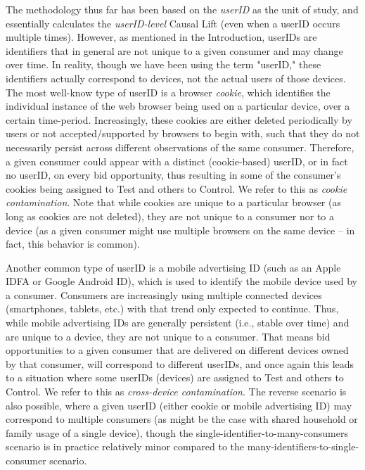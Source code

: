 \documentclass[11pt,a4paper]{article}
\theoremstyle{definition}
\theoremstyle{remark}
\theoremstyle{definition}
\theoremstyle{definition}
\theoremstyle{definition}
\theoremstyle{definition}
\theoremstyle{definition}
\theoremstyle{definition}
\begin{document}
The methodology thus far has been based on the \textit{userID} as the unit of study, and essentially calculates the \textit{userID-level} Causal Lift (even when a userID occurs multiple times). However, as mentioned in the Introduction, userIDs are identifiers that in general are not unique to a given consumer and may change over time. In reality, though we have been using the term "userID," these identifiers actually correspond to devices, not the actual users of those devices. The most well-know type of userID is a browser \textit{cookie}, which identifies the individual instance of the web browser being used on a particular device, over a certain time-period. Increasingly, these cookies are either deleted periodically by users or not accepted/supported by browsers to begin with, such that they do not necessarily persist across different observations of the same consumer. Therefore, a given consumer could appear with a distinct (cookie-based) userID, or in fact no userID, on every bid opportunity, thus resulting in some of the consumer's cookies being assigned to Test and others to Control. 
We refer to this as \textit{cookie contamination}. Note that while cookies are unique to a particular browser (as long as cookies are not deleted), they are not unique to a consumer nor to a device (as a given consumer might use multiple browsers on the same device -- in fact, this behavior is common).

Another common type of userID is a mobile advertising ID (such as an Apple IDFA or Google Android ID), which is used to identify the mobile device used by a consumer. Consumers are increasingly using multiple connected devices (smartphones, tablets, etc.) with that trend only expected to continue. Thus, while mobile advertising IDs are generally persistent (i.e., stable over time) and are unique to a device, they are not unique to a consumer. That means bid opportunities to a given consumer that are delivered on different devices owned by that consumer, will correspond to different userIDs, and once again this leads to a situation where some userIDs (devices) are assigned to Test and others to Control. We refer to this as \textit{cross-device contamination}. The reverse scenario is also possible, where a given userID (either cookie or mobile advertising ID) may correspond to multiple consumers (as might be the case with shared household or family usage of a single device), though the single-identifier-to-many-consumers scenario is in practice relatively minor compared to the many-identifiers-to-single-consumer scenario. 
\end{document}
